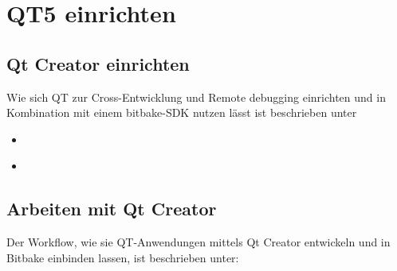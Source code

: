 
\chapter{QT5 einrichten}%
\label{cha:qt5_einrichten}

\section{Qt Creator einrichten}%
\label{sec:qt_creator_einrichten}


Wie sich QT zur Cross-Entwicklung und Remote debugging einrichten und in
Kombination mit einem bitbake-SDK nutzen lässt ist beschrieben unter

\begin{itemize}
    \item \cite[Seite
        269-276]{Gonzalez2018:Embedded_Linux_Development_Using_Yocto_Project_Cookbook_2nd}
    \item \cite [Working with Qt Creator]{PhyTec:Development_Guid}
\end{itemize}

\section{Arbeiten mit Qt Creator}%
\label{sec:arbeiten_mit_qt_creator}

Der Workflow, wie sie QT-Anwendungen mittels Qt Creator entwickeln und in
Bitbake einbinden lassen, ist beschrieben unter:
    \cite[Seite
        277-285]{Gonzalez2018:Embedded_Linux_Development_Using_Yocto_Project_Cookbook_2nd}


